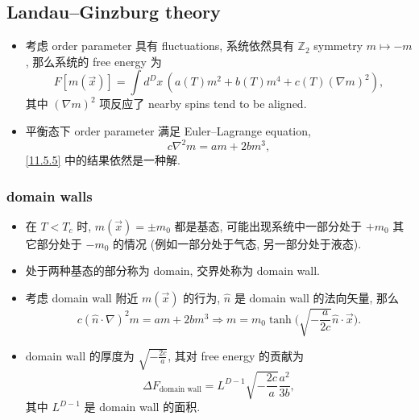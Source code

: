 \subsection{Landau--Ginzburg theory}
\begin{itemize}
	\item 考虑 order parameter 具有 fluctuations, 系统依然具有 $\mathbb{Z}_2$ symmetry $m \mapsto - m$, 那么系统的 free energy 为
	\begin{equation}
		F[m(\vec{x})] = \int d^D x \, (a(T) m^2 + b(T) m^4 + c(T) (\nabla m)^2),
	\end{equation}
	其中 $(\nabla m)^2$ 项反应了 nearby spins tend to be aligned.
	
	\item 平衡态下 order parameter 满足 Euler--Lagrange equation,
	\begin{equation} \label{11.5.19}
		c \nabla^2 m = a m + 2 b m^3,
	\end{equation}
	\eqref{11.5.5} 中的结果依然是一种解.
\end{itemize}

\subsubsection{domain walls}
\begin{itemize}
	\item 在 $T < T_c$ 时, $m(\vec{x}) = \pm m_0$ 都是基态, 可能出现系统中一部分处于 $+ m_0$ 其它部分处于 $- m_0$ 的情况 (例如一部分处于气态, 另一部分处于液态).
	
	\item 处于两种基态的部分称为 domain, 交界处称为 domain wall.
	
	\item 考虑 domain wall 附近 $m(\vec{x})$ 的行为, $\hat{n}$ 是 domain wall 的法向矢量, 那么
	\begin{equation}
		c (\hat{n} \cdot \nabla)^2 m = a m + 2 b m^3 \Longrightarrow m = m_0 \tanh \Big( \sqrt{- \frac{a}{2 c}} \hat{n} \cdot \vec{x} \Big).
	\end{equation}
	
	\item domain wall 的厚度为 $\sqrt{- \frac{2 c}{a}}$, 其对 free energy 的贡献为
	\begin{equation}
		\Delta F_\text{domain wall} = L^{D - 1} \sqrt{- \frac{2 c}{a}} \frac{a^2}{3 b},
	\end{equation}
	其中 $L^{D - 1}$ 是 domain wall 的面积.
\end{itemize}

